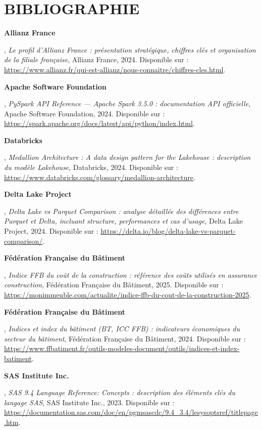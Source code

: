 \chapter*{BIBLIOGRAPHIE}
{}

\vspace{0.5cm}

\setlength{\parindent}{0pt}
\setlength{\parskip}{0.3cm}

\hypertarget{ref.allianz_france}{\textbf{Allianz France}}, \textit{Le profil d'Allianz France : présentation stratégique, chiffres clés et organisation de la filiale française}, Allianz France, 2024. Disponible sur : \url{https://www.allianz.fr/qui-est-allianz/nous-connaitre/chiffres-cles.html}.


\hypertarget{ref.apache}{\textbf{Apache Software Foundation}}, \textit{PySpark API Reference — Apache Spark 3.5.0 : documentation API officielle}, Apache Software Foundation, 2024. Disponible sur : \url{https://spark.apache.org/docs/latest/api/python/index.html}.

\hypertarget{ref.databricks_medallion}{\textbf{Databricks}}, \textit{Medallion Architecture : A data design pattern for the Lakehouse : description du modèle Lakehouse}, Databricks, 2024. Disponible sur : \url{https://www.databricks.com/glossary/medallion-architecture}.

\hypertarget{ref.delta}{\textbf{Delta Lake Project}}, \textit{Delta Lake vs Parquet Comparison : analyse détaillée des différences entre Parquet et Delta, incluant structure, performances et cas d'usage}, Delta Lake Project, 2024. Disponible sur : \url{https://delta.io/blog/delta-lake-vs-parquet-comparison/}.

\hypertarget{ref.ffb_2025}{\textbf{Fédération Française du Bâtiment}}, \textit{Indice FFB du coût de la construction : référence des coûts utilisés en assurance construction}, Fédération Française du Bâtiment, 2025. Disponible sur : \url{https://monimmeuble.com/actualite/indice-ffb-du-cout-de-la-construction-2025}.

\hypertarget{ref.ffb_2024}{\textbf{Fédération Française du Bâtiment}}, \textit{Indices et index du bâtiment (BT, ICC FFB) : indicateurs économiques du secteur du bâtiment}, Fédération Française du Bâtiment, 2024. Disponible sur : \url{https://www.ffbatiment.fr/outils-modeles-document/outils/indices-et-index-batiment}.

\hypertarget{ref.sas}{\textbf{SAS Institute Inc.}}, \textit{SAS 9.4 Language Reference: Concepts : description des éléments clés du langage SAS}, SAS Institute Inc., 2023. Disponible sur : \url{https://documentation.sas.com/doc/en/pgmsascdc/9.4_3.4/lesysoptsref/titlepage.htm}.

